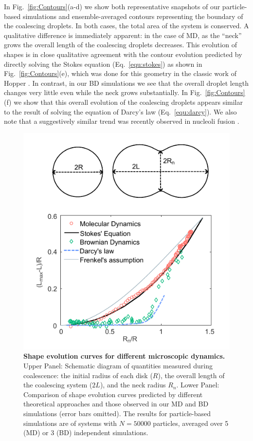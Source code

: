 \documentclass[%
reprint,
amsmath,amssymb,
aps,
]{revtex4-2}
\begin{document}
	In Fig.~\ref{fig:Contours}(a-d) we show both representative snapshots of our particle-based simulations and ensemble-averaged contours representing the boundary of the coalescing droplets. In both cases, the total area of the system is conserved. A qualitative difference is immediately  apparent: in the case of MD, as the ``neck'' grows the overall length of the coalescing droplets decreases. This evolution of shapes is in close qualitative agreement with the contour evolution predicted by directly solving the Stokes equation (Eq.~\ref{equ:stokes}) as shown in Fig.~\ref{fig:Contours}(e), which was done for this geometry in the classic work of Hopper \cite{hopperCoalescenceTwoViscous1993,hopperCoalescenceTwoViscous1993a}. In contrast, in our BD simulations we see that the overall droplet length changes very little even while the neck grows substantially. In Fig.~\ref{fig:Contours}(f) we show that this overall evolution of the coalescing droplets appears similar to the result of solving the equation of Darcy's law (Eq.~\ref{equ:darcy}). We also note that a suggestively similar trend was recently observed in nucleoli fusion \cite{caragineSurfaceFluctuationsCoalescence2018a}. 
 
	\begin{figure}[ht]
		\centering
		\includegraphics[width=\columnwidth]{Figure2.pdf}
		\caption{\textbf{Shape evolution curves for different microscopic dynamics.} Upper Panel: Schematic diagram of quantities measured during coalescence: the initial radius of each disk ($R$), the overall length of the coalescing system ($2L$), and the neck radius $R_n$. Lower Panel: Comparison of shape evolution curves predicted by different theoretical approaches and those observed in our MD and BD simulations (error bars omitted). The results for particle-based simulations are of systems with $N=50000$ particles, averaged over 5 (MD) or 3 (BD) independent simulations.} 
		\label{fig:shape evolution}
	\end{figure}
\end{document}
